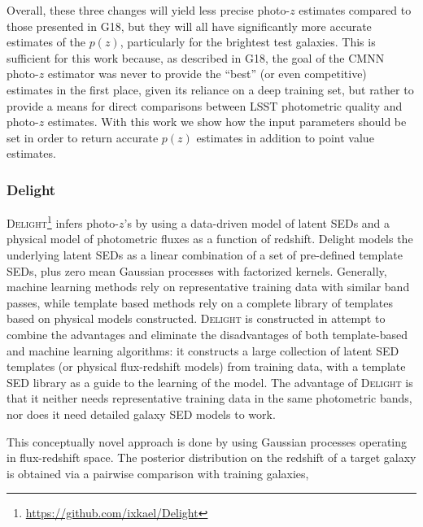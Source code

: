 Overall, these three changes will yield less precise photo-$z$ estimates compared to those presented in G18, but they will all have significantly more accurate estimates of the $p(z)$, particularly for the brightest test galaxies.
This is sufficient for this work because, as described in G18, the goal of the \textsc{CMNN} photo-$z$ estimator was never to provide the ``best'' (or even competitive) estimates in the first place, given its reliance on a deep training set, but rather to provide a means for direct comparisons between LSST photometric quality and photo-$z$ estimates.
With this work we show how the input parameters should be set in order to return accurate $p(z)$ estimates in addition to point value estimates.


\subsubsection{Delight}
\label{sec:delight}

\textsc{Delight}\footnote{\url{https://github.com/ixkael/Delight}} \citep{Leistedt:17} infers photo-$z$'s by using a data-driven model of latent SEDs and a physical model of photometric fluxes as a function of redshift.
Delight models the underlying latent SEDs as a linear combination of a set of pre-defined template SEDs, plus zero mean Gaussian processes with factorized kernels.
Generally, machine learning methods rely on representative training data with similar band passes, while template based methods rely on a complete library of templates based on physical models constructed.
\textsc{Delight} is constructed in attempt to combine the advantages and eliminate the disadvantages of both template-based and machine learning algorithms: it constructs a large collection of latent SED templates (or physical flux-redshift models) from training data, with a template SED library as a guide to the learning of the model.
The advantage of \textsc{Delight} is that it neither needs representative training data in the same photometric bands, nor does it need detailed galaxy SED models to work.

This conceptually novel approach is done by using Gaussian processes operating in flux-redshift space.
The posterior distribution on the redshift of a target galaxy is obtained via a pairwise comparison with training galaxies,


